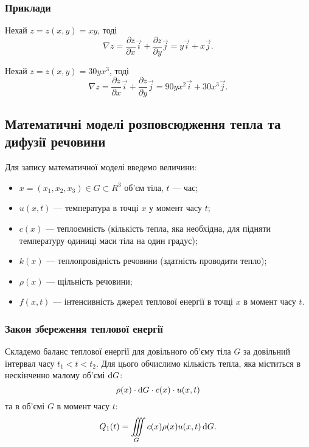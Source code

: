 \subsubsection{Приклади}

\begin{example}
	Нехай $z = z(x, y) = x y$, тоді
	\begin{equation}
		\nabla z = \frac{\partial z}{\partial x} \vec{i} + \frac{\partial z}{\partial y} \vec{j} = y \vec{i} + x \vec{j}.
	\end{equation}
\end{example}

\begin{example}
	Нехай $z = z(x, y) = 30 y x^3$, тоді
	\begin{equation}
		\nabla z = \frac{\partial z}{\partial x} \vec{i} + \frac{\partial z}{\partial y} \vec{j} = 90 y x^2 \vec{i} + 30 x^3 \vec{j}.
	\end{equation}
\end{example}

\subsection{Математичні моделі розповсюдження тепла та дифузії речовини}

Для запису математичної моделі введемо величини:
\begin{itemize}
	\item $x = (x_1, x_2, x_3) \in G \subset R^3$ об'єм тіла, $t$ --- час;
	\item $u(x, t)$ --- температура в точці $x$ у момент часу $t$;
	\item $c(x)$ --- теплоємність (кількість тепла, яка необхідна, для підняти температуру одиниці маси тіла на один градус);
	\item $k(x)$ --- теплопровідність речовини (здатність проводити тепло);
	\item $\rho(x)$ --- щільність речовини;
	\item $f(x, t)$ --- інтенсивність джерел теплової енергії в точці $x$ в момент часу $t$.
\end{itemize}

\subsubsection{Закон збереження теплової енергії}

Складемо баланс теплової енергії для довільного об'єму тіла $G$ за довільний інтервал часу $t_1 < t < t_2$. Для цього обчислимо кількість тепла, яка міститься в нескінченно малому об'ємі $\mathop{}\!\mathrm{d} G$: 
\begin{equation}
	\rho(x) \cdot \mathop{}\!\mathrm{d} G \cdot c(x) \cdot u(x, t)
\end{equation}
та в об'ємі $G$ в момент часу $t$:
\begin{equation}
	Q_1(t) = \displaystyle\iiint\limits_G c(x) \rho(x) u(x, t) \mathop{}\!\mathrm{d} G.
\end{equation}

